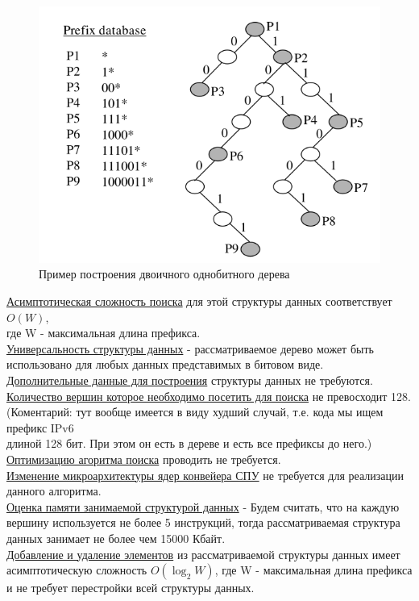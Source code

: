 \documentclass[a4peper, 12pt, titlepage, finall]{report}
\begin{document}
            \begin{figure}[h]      
                \includegraphics[width=\textwidth]{one_bit_tree.png}
                \caption{Пример построения двоичного однобитного дерева}
                \label{fig:mesh1}
            \end{figure}

            \underline{Асимптотическая сложность поиска} для этой структуры данных соответствует {\ttfamily $O(W)$},\\
            где {\ttfamily W} - максимальная длина префикса.\\
            \underline{Универсальность структуры данных} - рассматриваемое дерево может быть использовано для любых данных представимых в битовом виде.\\
            \underline{Дополнительные данные для построения} структуры данных не требуются.\\
            \underline{Количество вершин которое необходимо посетить для поиска} не превосходит 128.
            {\ttfamily (Коментарий: тут вообще имеется в виду худший случай, т.е. кода мы ищем префикс IPv6\\ длиной 128 бит. При этом он есть в дереве и есть все префиксы до него.)}\\
            \underline{Оптимизацию агоритма поиска} проводить не требуется.\\
            \underline{Изменение микроархитектуры ядер конвейера СПУ} не требуется для реализации данного алгоритма.\\
            \underline{Оценка памяти занимаемой структурой данных} - Будем считать, что на каждую вершину используется не более 5 инструкций,
            тогда рассматриваемая структура данных занимает не более чем 15000 Кбайт.\\
            \underline{Добавление и удаление элементов} из рассматриваемой структуры данных имеет асимптотическую сложность 
            {\ttfamily $O(\log_2{W})$}, где {\ttfamily W} - максимальная длина префикса и не требует перестройки всей структуры данных.\\
\end{document}
